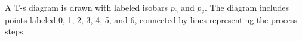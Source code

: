 A T-s diagram is drawn with labeled isobars \( p_0 \) and \( p_2 \). The diagram includes points labeled 0, 1, 2, 3, 4, 5, and 6, connected by lines representing the process steps.